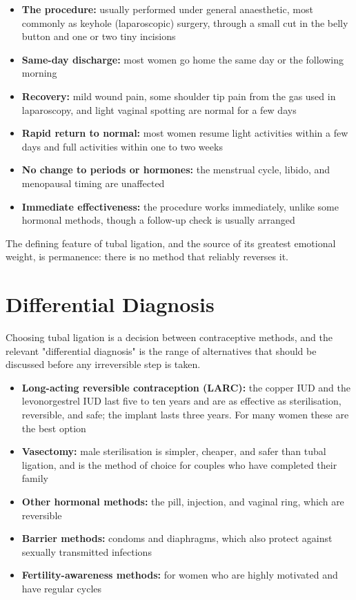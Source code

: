 \begin{itemize}
    \item \textbf{The procedure:} usually performed under general anaesthetic, most commonly as keyhole (laparoscopic) surgery, through a small cut in the belly button and one or two tiny incisions
    \item \textbf{Same-day discharge:} most women go home the same day or the following morning
    \item \textbf{Recovery:} mild wound pain, some shoulder tip pain from the gas used in laparoscopy, and light vaginal spotting are normal for a few days
    \item \textbf{Rapid return to normal:} most women resume light activities within a few days and full activities within one to two weeks
    \item \textbf{No change to periods or hormones:} the menstrual cycle, libido, and menopausal timing are unaffected
    \item \textbf{Immediate effectiveness:} the procedure works immediately, unlike some hormonal methods, though a follow-up check is usually arranged
\end{itemize}

The defining feature of tubal ligation, and the source of its greatest emotional weight, is permanence: there is no method that reliably reverses it.

\section*{Differential Diagnosis}
Choosing tubal ligation is a decision between contraceptive methods, and the relevant "differential diagnosis" is the range of alternatives that should be discussed before any irreversible step is taken.

\begin{itemize}
    \item \textbf{Long-acting reversible contraception (LARC):} the copper IUD and the levonorgestrel IUD last five to ten years and are as effective as sterilisation, reversible, and safe; the implant lasts three years. For many women these are the best option
    \item \textbf{Vasectomy:} male sterilisation is simpler, cheaper, and safer than tubal ligation, and is the method of choice for couples who have completed their family
    \item \textbf{Other hormonal methods:} the pill, injection, and vaginal ring, which are reversible
    \item \textbf{Barrier methods:} condoms and diaphragms, which also protect against sexually transmitted infections
    \item \textbf{Fertility-awareness methods:} for women who are highly motivated and have regular cycles
\end{itemize}

